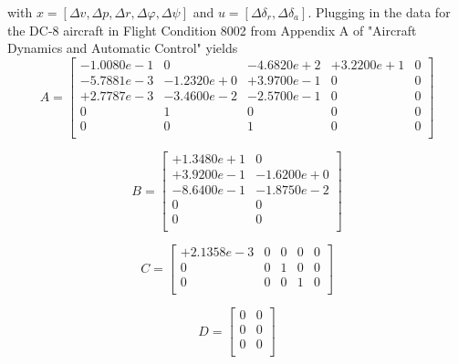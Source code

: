 \documentclass[12pt]{article}
\begin{document}
\noindent with $x = [\Delta v, \Delta p, \Delta r, \Delta \varphi, \Delta \psi]$ and $u =[\Delta \delta_r, \Delta \delta_a]$. Plugging in the data for the DC-8 aircraft in Flight Condition 8002 from Appendix A of "Aircraft Dynamics and Automatic Control" yields
\begin{equation*}
A =
\begin{bmatrix}
  -1.0080e-1 &          0 & -4.6820e+2 & +3.2200e+1  &          0 \\
  -5.7881e-3 & -1.2320e+0 & +3.9700e-1 &          0  &          0 \\
  +2.7787e-3 & -3.4600e-2 & -2.5700e-1 &          0  &          0 \\
           0 &          1 &          0 &          0  &          0 \\
           0 &          0 &          1 &          0  &          0 \\

\end{bmatrix}
\end{equation*}

\begin{equation*}
B =
\begin{bmatrix}
  +1.3480e+1 &          0 \\
  +3.9200e-1 & -1.6200e+0 \\
  -8.6400e-1 & -1.8750e-2 \\
           0 &          0 \\
           0 &          0 \\
\end{bmatrix}
\end{equation*}

\begin{equation*}
C =
\begin{bmatrix}
   +2.1358e-3 &           0 &           0  &          0 &           0 \\
            0 &           0 &           1  &          0 &           0 \\
            0 &           0 &           0  &          1 &           0 \\
\end{bmatrix}
\end{equation*}

\begin{equation*}
D =
\begin{bmatrix}
     0  &   0 \\
     0  &   0 \\
     0  &   0 \\
\end{bmatrix}
\end{equation*}
\end{document}
